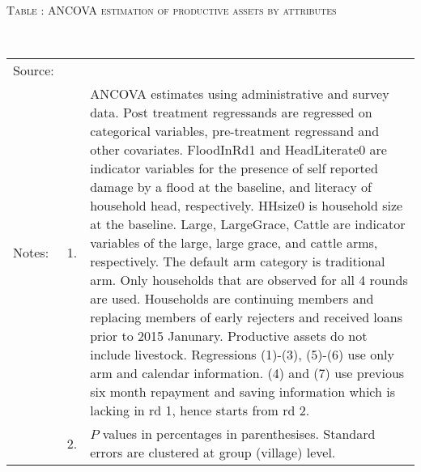 \hspace{-1cm}\begin{minipage}[t]{14cm}
\hfil\textsc{\normalsize Table \thetable: ANCOVA estimation of productive assets by attributes\label{tab ANCOVA productive assets attributes}}\\
\setlength{\tabcolsep}{1pt}
\setlength{\baselineskip}{8pt}
\renewcommand{\arraystretch}{.55}
\hfil{}\\
\renewcommand{\arraystretch}{.8}
\setlength{\tabcolsep}{1pt}
\begin{tabular}{>{\hfill\scriptsize}p{1cm}<{}>{\hfill\scriptsize}p{.25cm}<{}>{\scriptsize}p{12cm}<{\hfill}}
Source:& \multicolumn{2}{l}{\scriptsize Estimated with GUK administrative and survey data.}\\
Notes: & 1. & ANCOVA estimates using administrative and survey data. Post treatment regressands are regressed on categorical variables, pre-treatment regressand and other covariates. \textsf{FloodInRd1} and \textsf{HeadLiterate0} are indicator variables for the presence of self reported damage by a flood at the baseline, and literacy of household head, respectively. \textsf{HHsize0} is household size at the baseline. \textsf{Large}, \textsf{LargeGrace}, \textsf{Cattle} are indicator variables of the \textsf{large}, \textsf{large grace}, and \textsf{cattle} arms, respectively. The default arm category is \textsf{traditional} arm. Only households that are observed for all 4 rounds are used. Households are continuing members and replacing members of early rejecters and received loans prior to 2015 Janunary. Productive assets do not include livestock. Regressions (1)-(3), (5)-(6) use only arm and calendar information. (4) and (7) use previous six month repayment and saving information which is lacking in rd 1, hence starts from rd 2.\\
& 2. & $P$ values in percentages in parenthesises. Standard errors are clustered at group (village) level.
\end{tabular}
\end{minipage}

